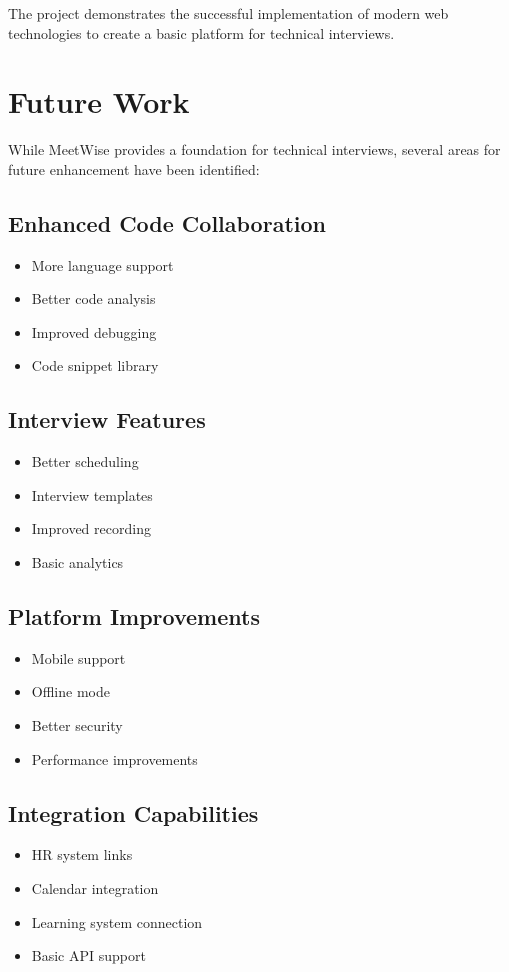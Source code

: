 \documentclass[12pt,a4paper]{report}
\begin{document}
The project demonstrates the successful implementation of modern web technologies to create a basic platform for technical interviews.

\section{Future Work}
While MeetWise provides a foundation for technical interviews, several areas for future enhancement have been identified:

\subsection{Enhanced Code Collaboration}
\begin{itemize}
   \item More language support
   \item Better code analysis
   \item Improved debugging
   \item Code snippet library
\end{itemize}

\subsection{Interview Features}
\begin{itemize}
   \item Better scheduling
   \item Interview templates
   \item Improved recording
   \item Basic analytics
\end{itemize}

\subsection{Platform Improvements}
\begin{itemize}
   \item Mobile support
   \item Offline mode
   \item Better security
   \item Performance improvements
\end{itemize}

\subsection{Integration Capabilities}
\begin{itemize}
   \item HR system links
   \item Calendar integration
   \item Learning system connection
   \item Basic API support
\end{itemize}
\end{document}
